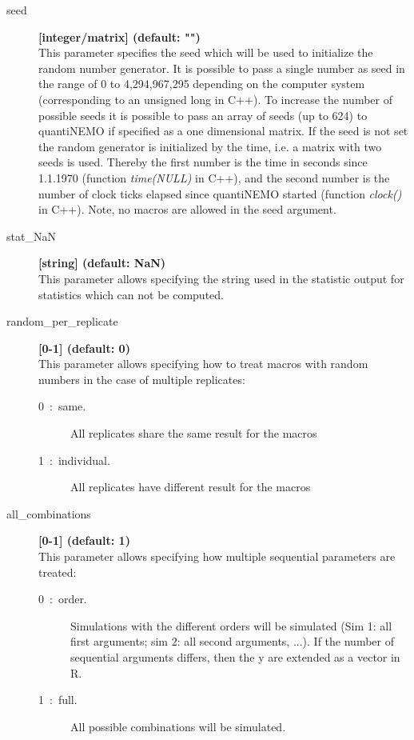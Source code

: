 \documentclass[letterpaper,12pt,oneside]{book}
\begin{document}
\begin{description}
\item[seed] \textbf{[integer/matrix] (default: "")}\\
This parameter specifies the seed which will be used to initialize the random number generator. It is possible to pass a single number as seed in the range of 0 to 4,294,967,295 depending on the computer system (corresponding to an unsigned long in C++). To increase the number of possible seeds it is possible to pass an array of seeds (up to 624) to quantiNEMO if specified as a one dimensional matrix. If the seed is not set the random generator is initialized by the time, i.e. a matrix with two seeds is used. Thereby the first number is the time in seconds since 1.1.1970 (function \textit{time(NULL)} in C++), and the second number is the number of clock ticks elapsed since quantiNEMO started (function \textit{clock()} in C++). Note, no macros are allowed in the seed argument.\\


\item[stat\_NaN] \textbf{[string] (default: NaN)}\\
This parameter allows specifying the string used in the statistic output for statistics which can not be computed.

\item[random\_per\_replicate] \textbf{[0-1] (default: 0)}\\
This parameter allows specifying how to treat macros with random numbers in the case of multiple replicates:
\begin{description}
	\item[0~:~same.] All replicates share the same result for the macros
	\item[1~:~individual.] All replicates have different result for the macros
\end{description}

\item[all\_combinations] \textbf{[0-1] (default: 1)}\\
This parameter allows specifying how multiple sequential parameters are treated:
\begin{description}
	\item[0~:~order.] Simulations with the different orders will be simulated (Sim 1: all first arguments; sim 2: all second arguments, ...). If the number of sequential arguments differs, then the y are extended as a vector in R.
	\item[1~:~full.] All possible combinations will be simulated. 
\end{description}


\end{description}
\end{document}
